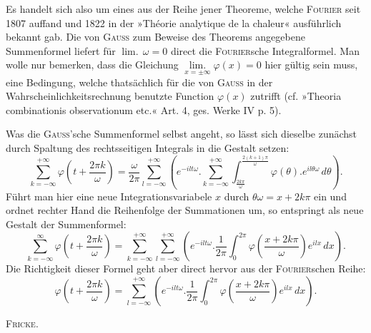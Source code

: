 %

\noindent Es handelt sich also um eines aus der Reihe jener Theoreme, welche \textsc{Fourier} seit 1807 auffand und 1822 in der »Théorie analytique de la chaleur« ausf\"uhrlich bekannt gab. Die von \textsc{Gauss} zum Beweise des Theorems angegebene Summenformel liefert f\"ur $\operatorname{lim.}\,\omega=0$ direct die \textsc{Fourier}sche Integralformel. Man wolle nur bemerken, dass die Gleichung $\mathop{\mathrm{lim.}}\limits_{x=\pm\infty}\varphi(x)=0$ hier g\"ultig sein muss, eine Bedingung, welche thats\"achlich f\"ur die von \textsc{Gauss} in der Wahrscheinlichkeitsrechnung benutzte Function $\varphi(x)$ zutrifft (cf. »Theoria combinationis observationum etc.« Art. 4, ges. Werke IV p. 5).

Was die \textsc{Gauss}'sche Summenformel selbst angeht, so l\"asst sich dieselbe zun\"achst durch Spaltung des rechtsseitigen Integrals in die Gestalt setzen:
\[
\sum^{+\infty}_{k=-\infty}\varphi\!\left(t+\frac{2\pi k}{\omega}\right) = \frac{\omega}{2\pi}\sum^{+\infty}_{l=-\infty}\left(e^{-ilt\omega}\mathord{.}\sum^{+\infty}_{k=-\infty}\int^{\frac{2(k+1)\pi}{\omega}}_{\frac{2k\pi}{\omega}}\varphi(\theta)\mathord{.} e^{il\theta\omega}\,d\theta\right).
\]
\noindent F\"uhrt man hier eine neue Integrationsvariabele $x$ durch $\theta\omega = x+2k\pi$ ein und ordnet rechter Hand die Reihenfolge der Summationen um, so entspringt als neue Gestalt der Summenformel:
\[
\sum^{\infty}_{k=-\infty}\varphi\!\left(t+\frac{2\pi k}{\omega}\right) = \sum^{+\infty}_{k=-\infty}\sum^{+\infty}_{l=-\infty}\left(e^{-ilt\omega}\mathord{.}\frac{1}{2\pi}\int^{2\pi}_{0}\varphi\!\left(\frac{x+2k\pi}{\omega}\right)e^{ilx}\,dx\right).
\]
\noindent Die Richtigkeit dieser Formel geht aber direct hervor aus der \textsc{Fourier}schen Reihe:
\[
\varphi\!\left(t+\frac{2\pi k}{\omega}\right) = \sum^{+\infty}_{l=-\infty}\left(e^{-ilt\omega}\mathord{.}\frac{1}{2\pi}\int^{2\pi}_{0}\varphi\!\left(\frac{x+2k\pi}{\omega}\right)e^{ilx}\,dx\right).
\]

\begin{flushright}
\textsc{Fricke}.
\end{flushright}

